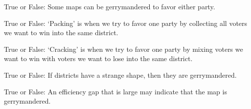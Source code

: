 \documentclass[nooutcomes,noauthor]{ximera}
\author{Bart Snapp}
\begin{document}
\maketitle




\begin{exercise} True or False:
 Some maps can be gerrymandered to favor either party.
\end{exercise}

\begin{exercise} True or False:
 `Packing' is when we try to favor one party by collecting all voters we
 want to win into the same district.
\end{exercise}

\begin{exercise} True or False:
 `Cracking' is when we try to favor one party by mixing voters we want
  to win with voters we want to lose into the same district.
\end{exercise}


\begin{exercise}
  True or False: If districts have a strange shape, then they are
  gerrymandered.
\end{exercise}




\begin{exercise}
  True or False: An efficiency gap that is large may indicate that the
  map is gerrymandered.
\end{exercise}



\end{document}
